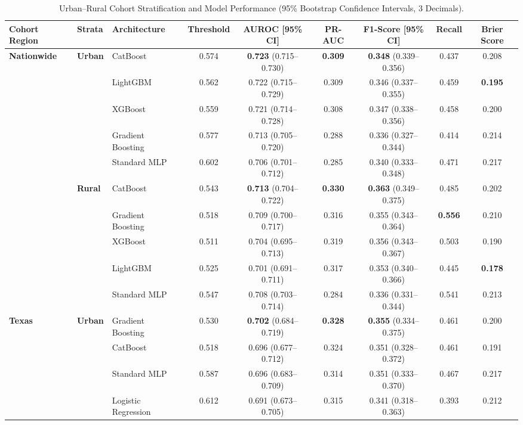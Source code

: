 \documentclass[10pt,journal]{IEEEtran}
\begin{document}
\begin{table}[!t]
\caption{Urban--Rural Cohort Stratification and Model Performance (95\% Bootstrap Confidence Intervals, 3 Decimals).}
\label{tab:s_urban_rural}
\centering
\footnotesize
\begin{tabular}{lllcccccc}
\toprule
\textbf{Cohort Region} & \textbf{Strata} & \textbf{Architecture} & \textbf{Threshold} & \textbf{AUROC [95\% CI]} & \textbf{PR-AUC} & \textbf{F1-Score [95\% CI]} & \textbf{Recall} & \textbf{Brier Score} \\
\midrule
\textbf{Nationwide} & \textbf{Urban} & CatBoost & 0.574 & \textbf{0.723} (0.715--0.730) & \textbf{0.309} & \textbf{0.348} (0.339--0.356) & 0.437 & 0.208 \\
 & & LightGBM & 0.562 & 0.722 (0.715--0.729) & 0.309 & 0.346 (0.337--0.355) & 0.459 & \textbf{0.195} \\
 & & XGBoost & 0.559 & 0.721 (0.714--0.728) & 0.308 & 0.347 (0.338--0.356) & 0.458 & 0.200 \\
 & & Gradient Boosting & 0.577 & 0.713 (0.705--0.720) & 0.288 & 0.336 (0.327--0.344) & 0.414 & 0.214 \\
 & & Standard MLP & 0.602 & 0.706 (0.701--0.712) & 0.285 & 0.340 (0.333--0.348) & 0.471 & 0.217 \\
\cmidrule{2-9}
 & \textbf{Rural} & CatBoost & 0.543 & \textbf{0.713} (0.704--0.722) & \textbf{0.330} & \textbf{0.363} (0.349--0.375) & 0.485 & 0.202 \\
 & & Gradient Boosting & 0.518 & 0.709 (0.700--0.717) & 0.316 & 0.355 (0.343--0.364) & \textbf{0.556} & 0.210 \\
 & & XGBoost & 0.511 & 0.704 (0.695--0.713) & 0.319 & 0.356 (0.343--0.367) & 0.503 & 0.190 \\
 & & LightGBM & 0.525 & 0.701 (0.691--0.711) & 0.317 & 0.353 (0.340--0.366) & 0.445 & \textbf{0.178} \\
 & & Standard MLP & 0.547 & 0.708 (0.703--0.714) & 0.284 & 0.336 (0.331--0.344) & 0.541 & 0.213 \\
\midrule
\textbf{Texas} & \textbf{Urban} & Gradient Boosting & 0.530 & \textbf{0.702} (0.684--0.719) & \textbf{0.328} & \textbf{0.355} (0.334--0.375) & 0.461 & 0.200 \\
 & & CatBoost & 0.518 & 0.696 (0.677--0.712) & 0.324 & 0.351 (0.328--0.372) & 0.461 & 0.191 \\
 & & Standard MLP & 0.587 & 0.696 (0.683--0.709) & 0.314 & 0.351 (0.333--0.370) & 0.467 & 0.217 \\
 & & Logistic Regression & 0.612 & 0.691 (0.673--0.705) & 0.315 & 0.341 (0.318--0.363) & 0.393 & 0.212 \\

\end{tabular}
\end{table}
\end{document}
